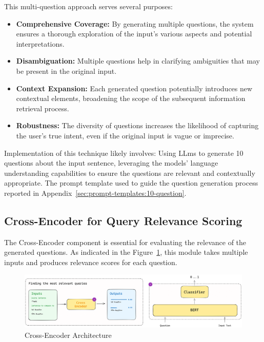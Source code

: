 This multi-question approach serves several purposes:
\begin{itemize}
    \item \textbf{Comprehensive Coverage:} By generating multiple questions, the system ensures a thorough exploration of the input's various aspects and potential interpretations.
    \item \textbf{Disambiguation:} Multiple questions help in clarifying ambiguities that may be present in the original input.
    \item \textbf{Context Expansion:} Each generated question potentially introduces new contextual elements, broadening the scope of the subsequent information retrieval process.
    \item \textbf{Robustness:} The diversity of questions increases the likelihood of capturing the user's true intent, even if the original input is vague or imprecise.
\end{itemize}

Implementation of this technique likely involves:
Using \ac{LLms} to generate 10 questions about the input sentence, leveraging the models' language understanding capabilities to ensure the questions are relevant and contextually appropriate.
The prompt template used to guide the question generation process reported in Appendix~\ref{sec:prompt-templates:10-question}.

\subsection{Cross-Encoder for Query Relevance Scoring}\label{subsec:cross-encoder-for-query-relevance-scoring}
The Cross-Encoder component is essential for evaluating the relevance of the generated questions.
As indicated in the Figure~\ref{fig:cross-encoder-articture}, this module takes multiple inputs and produces relevance scores for each question.

\begin{figure}[ht!]
    \centering
    \begin{minipage}[b]{\textwidth}
        \centering
        \includegraphics[width=\textwidth]{res/Cross-Encoder}
        \caption{Cross-Encoder Architecture}
        \label{fig:cross-encoder-articture}
    \end{minipage}
\end{figure}

